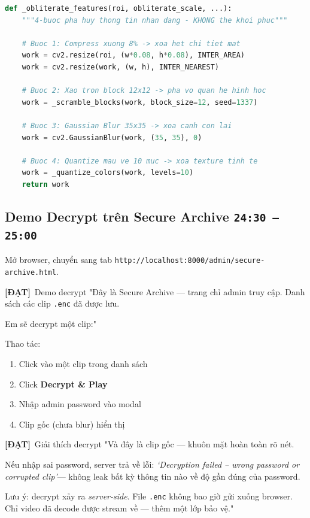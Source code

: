\documentclass[12pt, a4paper]{article}
\newcommand{\timing}[1]{%
  \hfill\colorbox{NavyBlue!20}{\texttt{\small #1}}%
}
\newcommand{\dat}{\textcolor{BrickRed}{\textbf{[ĐẠT]}}}
\begin{document}
\begin{lstlisting}[language=Python, caption={src/privacy.py --- obliterate (mạnh nhất)}]
def _obliterate_features(roi, obliterate_scale, ...):
    """4-buoc pha huy thong tin nhan dang - KHONG the khoi phuc"""

    # Buoc 1: Compress xuong 8% -> xoa het chi tiet mat
    work = cv2.resize(roi, (w*0.08, h*0.08), INTER_AREA)
    work = cv2.resize(work, (w, h), INTER_NEAREST)

    # Buoc 2: Xao tron block 12x12 -> pha vo quan he hinh hoc
    work = _scramble_blocks(work, block_size=12, seed=1337)

    # Buoc 3: Gaussian Blur 35x35 -> xoa canh con lai
    work = cv2.GaussianBlur(work, (35, 35), 0)

    # Buoc 4: Quantize mau ve 10 muc -> xoa texture tinh te
    work = _quantize_colors(work, levels=10)
    return work
\end{lstlisting}

\subsection{Demo Decrypt trên Secure Archive \timing{24:30 – 25:00}}

\begin{action}
Mở browser, chuyển sang tab \texttt{http://localhost:8000/admin/secure-archive.html}.
\end{action}

\begin{dialog}{\dat\ Demo decrypt}
"Đây là Secure Archive --- trang chỉ admin truy cập.
Danh sách các clip \texttt{.enc} đã được lưu.

Em sẽ decrypt một clip:"
\end{dialog}

\begin{action}
Thao tác:
\begin{enumerate}
  \item Click vào một clip trong danh sách
  \item Click \textbf{Decrypt \& Play}
  \item Nhập admin password vào modal
  \item Clip gốc (chưa blur) hiển thị
\end{enumerate}
\end{action}

\begin{dialog}{\dat\ Giải thích decrypt}
"Và đây là clip gốc --- khuôn mặt hoàn toàn rõ nét.

Nếu nhập sai password, server trả về lỗi:
\textit{`Decryption failed – wrong password or corrupted clip'}---
không leak bất kỳ thông tin nào về độ gần đúng của password.

Lưu ý: decrypt xảy ra \textit{server-side}.
File \texttt{.enc} không bao giờ gửi xuống browser.
Chỉ video đã decode được stream về --- thêm một lớp bảo vệ."
\end{dialog}
\end{document}
